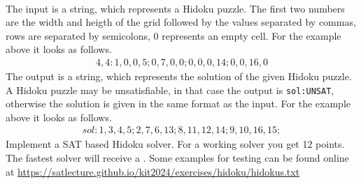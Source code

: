 \documentclass{article}
\begin{document}
~\\[1ex]
The input is a string, which represents a Hidoku puzzle.
The first two numbers are the width and heigth of the grid followed by the values separated by commas, rows are separated by semicolons, 0 represents an empty cell.
For the example above it looks as follows.
\vspace*{-1ex}
\begin{align*}
4,4:1,0,0,5;0,7,0,0;0,0,0,14;0,0,16,0
\end{align*}%
%
The output is a string, which represents the solution of the given Hidoku puzzle.
A Hidoku puzzle may be unsatisfiable, in that case the output is \texttt{sol:UNSAT}, otherwise the solution is given in the same format as the input.
For the example above it looks as follows.
\vspace*{-1ex}
\begin{align*}
sol:1,3,4,5;2,7,6,13;8,11,12,14;9,10,16,15;
\end{align*}%
%
Implement a SAT based Hidoku solver.
For a working solver you get 12 points.
The fastest solver will receive a .
Some examples for testing can be found online at 
\url{https://satlecture.github.io/kit2024/exercises/hidoku/hidokus.txt}
\end{document}
